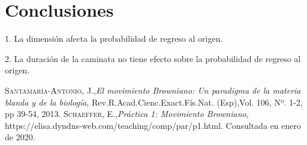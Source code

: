 ﻿\documentclass{article}
\begin{document}
\section{Conclusiones}\label{con}     
 
1.  La dimensi\'on afecta la probabilidad de regreso al origen.

2. La duraci\'on de la caminata no tiene efecto sobre la probabilidad de regreso al origen.


\begin{thebibliography}{0}
 \textsc{Santamar\'ia-Antonio, J.},\textit{El movimiento Browniano: Un paradigma de la materia blanda y de la biolog\'ia}, Rev.R.Acad.Cienc.Exact.F\'is.Nat. (Esp),Vol. 106, Nº. 1-2, pp 39-54, 2013.
 \textsc{Schaeffer, E.},\textit{Pr\'actica 1: Movimiento Browniano}, https://elisa.dyndns-web.com/teaching/comp/par/p1.html.  Consultada en enero de 2020.
\end{thebibliography}
\end{document}
